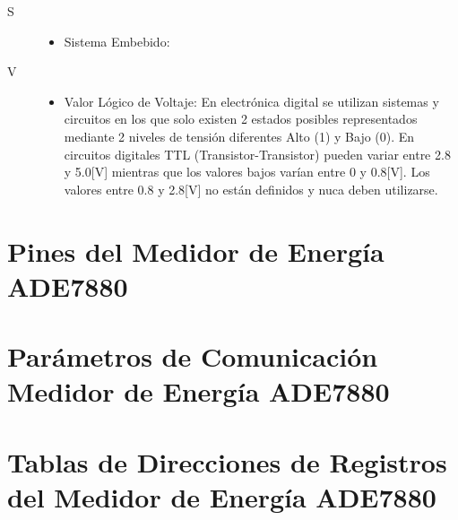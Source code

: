\documentclass[letterpaper,12pt,oneside]{book}
\begin{document}
\begin{description}
		\item[\LARGE S]
		\hfill
		\begin{itemize}
			\item Sistema Embebido: 
		\end{itemize}

		\item[\LARGE V]
		\hfill
		\begin{itemize}
			\item Valor Lógico de Voltaje: En electrónica digital se utilizan sistemas y circuitos en los que solo existen 2 estados posibles representados mediante 2 niveles de tensión diferentes Alto (1) y Bajo (0). En circuitos digitales TTL (Transistor-Transistor) pueden variar entre 2.8 y 5.0[V] mientras que los valores bajos varían entre 0 y 0.8[V]. Los valores entre 0.8 y 2.8[V] no están definidos y nuca deben utilizarse.
		\end{itemize}
	\end{description}
	
	
	
	\appendix

	\chapter{Pines del Medidor de Energía ADE7880}
		\label{PinesADE7880}
		

	\chapter{Parámetros de Comunicación Medidor de Energía ADE7880}
		\label{ComADE7880}
		

	\chapter{Tablas de Direcciones de Registros del Medidor de Energía ADE7880}
		\label{RegADE7880}
		

	\backmatter%
\end{document}
